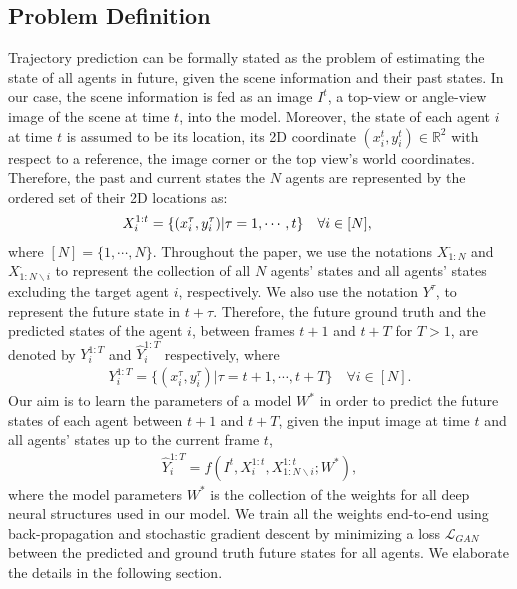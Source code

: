 \documentclass[10pt,twocolumn,letterpaper]{article}
\begin{document}
\subsection{Problem Definition}
\label{sec:Problem_Definition}
Trajectory prediction can be formally stated as the problem of estimating the state of all agents in future, given the scene information and their past states. In our case, the scene information is fed as an image $I^t$, \eg a top-view or angle-view image of the scene at time $t$, into the model. Moreover, the state of each agent $i$ at time $t$ is assumed to be its location, \eg its 2D coordinate $(x^t_i, y^t_i)\in \mathbb{R}^2$ with respect to a reference, \eg the image corner or the top view's world coordinates. Therefore, the past and current states the $N$ agents are represented by the ordered set of their 2D locations as: 
\begin{eqnarray}
\label{eq:input_def}
&&\hspace{-10mm} X^{1:t}_i = \{(x_i^\tau,y_i^\tau)| \tau = 1, \cdots, t\} \quad  \forall i\in[N],\nonumber
\end{eqnarray}
where $[N]=\{1,\cdots,N\}$. Throughout the paper, we use the notations $X^{\cdot}_{1:N}$ and $X^{\cdot}_{1:N\backslash i}$ to represent the collection of all $N$ agents' states and all agents' states excluding the target agent $i$, respectively. We also use the notation $Y^\tau$, to represent the future state in $t+\tau$. Therefore, the future ground truth and the predicted states of the agent $i$, between frames $t+1$ and $t+T$ for $T>1$, are denoted by $Y^{1:T}_i$ and $\hat{Y}^{1:T}_i$ respectively, where 
\begin{eqnarray}
\label{eq:gt_def_a}
Y^{1:T}_i  = \{(x_i^{\tau},y_i^{\tau})| \tau = t+1, \cdots, t+T  \} \quad \forall i\in[N]. \nonumber
\end{eqnarray}
Our aim is to learn the parameters of a model $W^*$ in order to predict the future states of each agent between $t+1$ and $t+T$, given the input image at time $t$ and all agents' states up to the current frame $t$, \ie 
\begin{eqnarray}
\label{eq:gt_def_b}
\hat{Y}^{1:T}_i = f(I^t, X^{1:t}_{i}, X^{1:t}_{1:N\backslash i};W^*), \nonumber
\end{eqnarray}
where the model parameters $W^*$ is the collection of the weights for all deep neural structures used in our model. We train all the weights end-to-end using back-propagation and stochastic gradient descent by minimizing a loss $\mathcal{L}_{GAN}$ between the predicted and ground truth future states for all agents. We elaborate the details in the following section.
\end{document}
